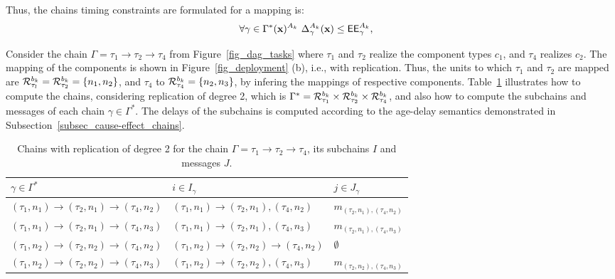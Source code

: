 Thus, the chains timing constraints are formulated for a mapping \ttx is:
\begin{align}
\label{eqn_chains_constraints}
\forall \gamma \in \ssp{\Gamma^*(\x)} \ \sss{\Delta}[k][{\gamma}](\x) & \leq \sss{\EE}[k][\gamma],
\end{align}
\begin{example} Consider the chain $\Gamma=\tau_1\rightarrow\tau_2\rightarrow\tau_4$ from Figure~\ref{fig_dag_tasks} where $\tau_1$ and $\tau_2$ realize the component types $c_1$, and $\tau_4$ realizes $c_2$. The mapping of the components is shown in Figure~\ref{fig_deployment} (b), i.e., with replication. Thus, the units to which $\tau_1$ and $\tau_2$ are mapped are $\sss{\mathcal{R}}[k][\tau_l][b]=\sss{\mathcal{R}}[k][\tau_2][b]=\{n_1,n_2\}$, and $\tau_4$ to $\sss{\mathcal{R}}[k][\tau_4][b]=\{n_2,n_3\}$, by infering the mappings of respective components. Table~\ref{tbl_chains_with_replication} illustrates how to compute the chains, considering replication of degree 2, which is $\Gamma^* = \sss{\mathcal{R}}[k][\tau_1][b] \times \sss{\mathcal{R}}[k][\tau_2][b] \times \sss{\mathcal{R}}[k][\tau_4][b]$, and also how to compute the subchains and messages of each chain $\gamma\in \Gamma^*$. The delays of the subchains is computed according to the age-delay semantics demonstrated in Subsection~\ref{subsec_cause-effect_chains}.
\end{example} 
\begin{table}[]
	\begin{tabular}{@{}lll@{}}
		\toprule
		$\gamma\in \Gamma^*$ & $i\in I_\gamma$ & $j\in J_\gamma$ \\ \midrule
		$(\tau_1,n_1)\rightarrow (\tau_2,n_1)\rightarrow(\tau_4,n_2)$ & $(\tau_1,n_1)\rightarrow (\tau_2,n_1),(\tau_4,n_2)$ & $m_{(\tau_2,n_1), (\tau_4,n_2)}$ \\
		$(\tau_1,n_1)\rightarrow (\tau_2,n_1)\rightarrow(\tau_4,n_3)$ & $(\tau_1,n_1)\rightarrow (\tau_2,n_1),(\tau_4,n_3)$ & $m_{(\tau_2,n_1), (\tau_4,n_3)}$ \\
		$(\tau_1,n_2)\rightarrow(\tau_2,n_2)\rightarrow(\tau_4,n_2)$ & $(\tau_1,n_2)\rightarrow(\tau_2,n_2)\rightarrow(\tau_4,n_2)$ & $\emptyset$ \\
		$(\tau_1,n_2)\rightarrow(\tau_2,n_2)\rightarrow(\tau_4,n_3)$ & $(\tau_1,n_2)\rightarrow(\tau_2,n_2),(\tau_4,n_3)$ & $m_{(\tau_2,n_2), (\tau_4,n_3)}$ \\ \bottomrule
	\end{tabular}
\caption{Chains with replication of degree 2 for the chain $\Gamma=\tau_1\rightarrow\tau_2\rightarrow\tau_4$, its subchains $I$ and messages $J$.}
\label{tbl_chains_with_replication}
\end{table}

